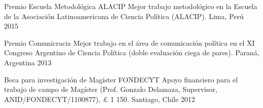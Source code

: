 


\begin{cvhonors}
\cvhonor
{Premio Escuela Metodológica ALACIP}
{Mejor trabajo metodológico en la Escuela de la Asociación Latinoamericana de Ciencia Política (ALACIP).}
{Lima, Perú}
{2015}
\end{cvhonors}

\vspace{1mm}





\begin{cvhonors}
\cvhonor
{Premio Comunicracia}
{Mejor trabajo en el área de comunicación política en el XI Congreso Argentino de Ciencia Política (doble evaluación ciega de pares).} %
{Paraná, Argentina}
{2013}
\end{cvhonors}

\vspace{1mm}


\vspace{1mm}

\begin{cvhonors}
\cvhonor
{Beca para investigación de Mag\'ister FONDECYT}
{Apoyo financiero para el trabajo de campo de Magíster (Prof. Gonzalo Delamaza, Supervisor, ANID/FONDECYT/1100877), {\pounds} 1 150.}
{Santiago, Chile}
{2012}
\end{cvhonors}

\vspace{1mm}
